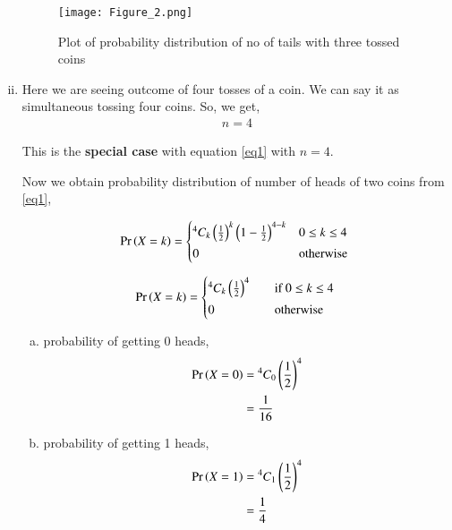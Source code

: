 \documentclass[journal,12pt,twocolumn]{IEEEtran}
\begin{document}
\begin{enumerate}[(i)]
\begin{figure}[h!]
    \centering
    \texttt{[image: Figure\_2.png]}
    \caption{Plot of probability distribution of no of tails with three tossed coins}
    \label{fig:Three coins}
\end{figure}

\item

Here we are seeing outcome of four tosses of a coin. We can say it as simultaneous tossing four coins. So, we get,
\begin{align}
    n=4
\end{align}

This is the \textbf{special case} with equation \eqref{eq1} with $n=4$.

Now we obtain probability distribution of number of heads of two coins from \eqref{eq1},

\begin{align*}
   \pr{X=k} =
  \begin{cases*}
    {^4 C_k}\brak{\frac{1}{2}}^{k}\brak{1-\frac{1}{2}}^{4-k} & $0 \leq k \leq 4$\\
    0 & otherwise
  \end{cases*}
\end{align*}

\begin{align}
   \pr{X=k} =
  \begin{cases*}
    {^4 C_k}\brak{\frac{1}{2}}^{4} \quad& if $0 \leq k \leq 4$ \\
    0 \quad& otherwise
  \end{cases*}
\end{align}

\begin{enumerate}[(a)]
    \item probability of getting 0 heads,
        \begin{align}
            \begin{split}
                \Pr\left(X=0\right) &= {^4C_0}\left(\frac{1}{2}\right)^4\\
                &=\frac{1}{16}
            \end{split}
        \end{align}

    \item probability of getting 1 heads,
        \begin{align}
            \begin{split}
                \Pr\left(X=1\right) &= {^4C_1}\left(\frac{1}{2}\right)^4\\
                &=\frac{1}{4}
            \end{split}
        \end{align}


\end{enumerate}
\end{enumerate}
\end{document}
